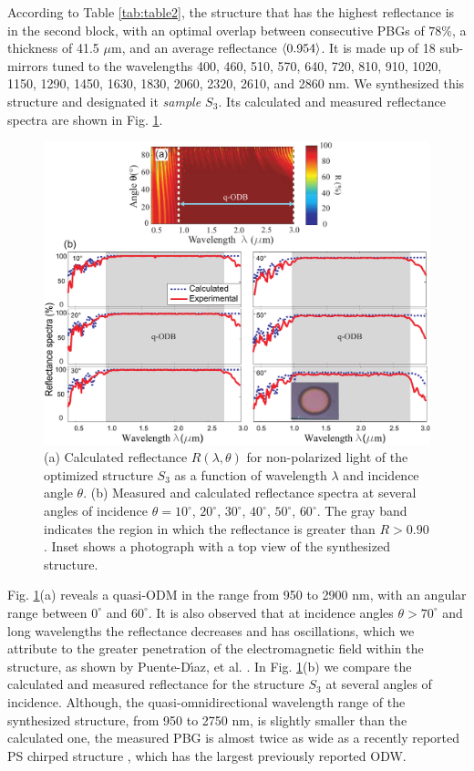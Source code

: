\documentclass[a4paper,fleqn]{cas-sc}
\begin{document}
According to Table \ref{tab:table2}, the structure that has the highest
reflectance is in the second block, with an optimal overlap between
consecutive PBGs of $78\%$, a thickness of
41.5 $\mu$m, and an average reflectance $\braket{0.954}$. It is made up
of 18 sub-mirrors tuned to the wavelengths
400, 460, 510, 570, 640, 720, 810, 910, 1020, 1150, 1290, 1450,
1630, 1830, 2060, 2320, 2610, and 2860 nm.
We synthesized this structure and designated it {\em sample $S_3$}.
Its calculated and measured
reflectance spectra are shown in Fig. \ref{Fig3}.
\begin{figure}
        \begin{center}
                \includegraphics[width=\textwidth]
                {F3Alternativa.pdf}
        \end{center}
        \caption{ (a) Calculated reflectance $R(\lambda,\theta)$ for non-polarized light of the optimized structure $S_3$
                as a function of wavelength $\lambda$ and incidence angle
                $\theta$. (b) Measured and calculated reflectance spectra at several
                angles of incidence $\theta=10^\circ$, $20^\circ$,
                $30^\circ$, $40^\circ$, $50^\circ$, $60^\circ$. The gray band indicates
                the region in which the reflectance is greater than $R>0.90$.  Inset shows a
                photograph with a top view of the synthesized structure.}
        \label{Fig3}
\end{figure}

Fig. \ref{Fig3}(a) reveals a quasi-ODM
in the range from 950 to 2900 nm, with an angular range between $0^\circ$ and
$60^\circ$. It is also observed that at incidence angles $\theta
>70^\circ$ and long
wavelengths the reflectance decreases and has oscillations, which we attribute to the
greater penetration of the electromagnetic field within the structure, as shown by
Puente-D\'{\i}az, et al. \cite{Puente2020}. In Fig. \ref{Fig3}(b) we compare the
calculated and measured reflectance for the structure $S_3$ at several angles of
incidence. Although, the quasi-omnidirectional wavelength range of
the synthesized structure, from 950 to 2750 nm, is slightly smaller than the calculated
one, the measured PBG is almost twice as wide
as a recently reported PS chirped structure \cite{Chavez2020}, which
has the largest previously reported ODW.
\end{document}
